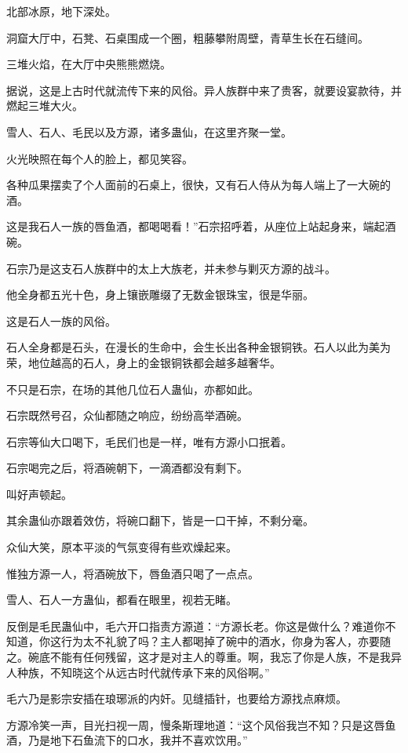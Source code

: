 
\begin{this_body}

北部冰原，地下深处。

洞窟大厅中，石凳、石桌围成一个圈，粗藤攀附周壁，青草生长在石缝间。

三堆火焰，在大厅中央熊熊燃烧。

据说，这是上古时代就流传下来的风俗。异人族群中来了贵客，就要设宴款待，并燃起三堆大火。

雪人、石人、毛民以及方源，诸多蛊仙，在这里齐聚一堂。

火光映照在每个人的脸上，都见笑容。

各种瓜果摆卖了个人面前的石桌上，很快，又有石人侍从为每人端上了一大碗的酒。

这是我石人一族的唇鱼酒，都喝喝看！”石宗招呼着，从座位上站起身来，端起酒碗。

石宗乃是这支石人族群中的太上大族老，并未参与剿灭方源的战斗。

他全身都五光十色，身上镶嵌雕缀了无数金银珠宝，很是华丽。

这是石人一族的风俗。

石人全身都是石头，在漫长的生命中，会生长出各种金银铜铁。石人以此为美为荣，地位越高的石人，身上的金银铜铁都会越多越奢华。

不只是石宗，在场的其他几位石人蛊仙，亦都如此。

石宗既然号召，众仙都随之响应，纷纷高举酒碗。

石宗等仙大口喝下，毛民们也是一样，唯有方源小口抿着。

石宗喝完之后，将酒碗朝下，一滴酒都没有剩下。

叫好声顿起。

其余蛊仙亦跟着效仿，将碗口翻下，皆是一口干掉，不剩分毫。

众仙大笑，原本平淡的气氛变得有些欢燥起来。

惟独方源一人，将酒碗放下，唇鱼酒只喝了一点点。

雪人、石人一方蛊仙，都看在眼里，视若无睹。

反倒是毛民蛊仙中，毛六开口指责方源道：“方源长老。你这是做什么？难道你不知道，你这行为太不礼貌了吗？主人都喝掉了碗中的酒水，你身为客人，亦要随之。碗底不能有任何残留，这才是对主人的尊重。啊，我忘了你是人族，不是我异人种族，不知晓这个从远古时代就传承下来的风俗啊。”

毛六乃是影宗安插在琅琊派的内奸。见缝插针，也要给方源找点麻烦。

方源冷笑一声，目光扫视一周，慢条斯理地道：“这个风俗我岂不知？只是这唇鱼酒，乃是地下石鱼流下的口水，我并不喜欢饮用。”


\end{this_body}
